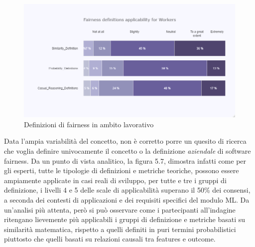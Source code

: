     \begin{center}
			\hspace*{-5mm}%
	\end{center}
    
     \begin{figure}[h!]
        \centering
        \includegraphics[width=1\textwidth]{figure/Analisi/RQ1/Hist_Fairness_Deginitions_Applicability.png}
        \caption{Definizioni di fairness in ambito lavorativo}
    \end{figure}
    
    Data l'ampia variabilità del concetto, non è corretto porre un quesito di ricerca che voglia definire univocamente il concetto o la definizione \emph{aziendale} di software fairness. Da un punto di vista analitico, la figura 5.7, dimostra infatti come per gli esperti, tutte le tipologie di definizioni e metriche teoriche, possono essere ampiamente applicate in casi reali di sviluppo, per tutte e tre i gruppi di definizione, i livelli 4 e 5 delle scale di applicabilità superano il 50\% dei consensi, a seconda dei contesti di applicazioni e dei requisiti specifici del modulo ML. Da un'analisi più attenta, però si può osservare come i partecipanti all'indagine ritengano lievemente più applicabili i gruppi di definizione e metriche basati su similarità matematica, rispetto a quelli definiti in puri termini probabilistici piuttosto che quelli basati su relazioni causali tra features e outcome.
    
